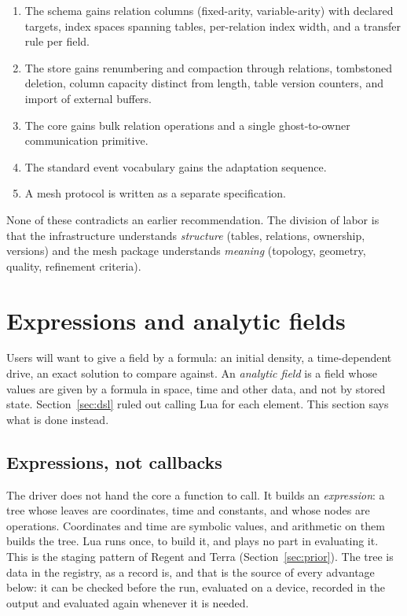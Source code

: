 \documentclass[11pt,a4paper]{article}
\begin{document}
\begin{enumerate}
  \item The schema gains relation columns (fixed-arity, variable-arity) with
        declared targets, index spaces spanning tables, per-relation index
        width, and a transfer rule per field.
  \item The store gains renumbering and compaction through relations,
        tombstoned deletion, column capacity distinct from length, table
        version counters, and import of external buffers.
  \item The core gains bulk relation operations and a single
        ghost-to-owner communication primitive.
  \item The standard event vocabulary gains the adaptation sequence.
  \item A mesh protocol is written as a separate specification.
\end{enumerate}

None of these contradicts an earlier recommendation.  The division of labor
is that the infrastructure understands \emph{structure} (tables, relations,
ownership, versions) and the mesh package understands \emph{meaning}
(topology, geometry, quality, refinement criteria).

\section{Expressions and analytic fields}
\label{sec:expressions}

Users will want to give a field by a formula: an initial density, a
time-dependent drive, an exact solution to compare against.  An
\emph{analytic field} is a field whose values are given by a formula in
space, time and other data, and not by stored state.
Section~\ref{sec:dsl} ruled out calling Lua for each element.  This section
says what is done instead.

\subsection{Expressions, not callbacks}

The driver does not hand the core a function to call.  It builds an
\emph{expression}: a tree whose leaves are coordinates, time and constants,
and whose nodes are operations.  Coordinates and time are symbolic values,
and arithmetic on them builds the tree.  Lua runs once, to build it, and
plays no part in evaluating it.  This is the staging pattern of Regent and
Terra (Section~\ref{sec:prior}).  The tree is data in the registry, as a
record is, and that is the source of every advantage below: it can be
checked before the run, evaluated on a device, recorded in the output and
evaluated again whenever it is needed.
\end{document}
